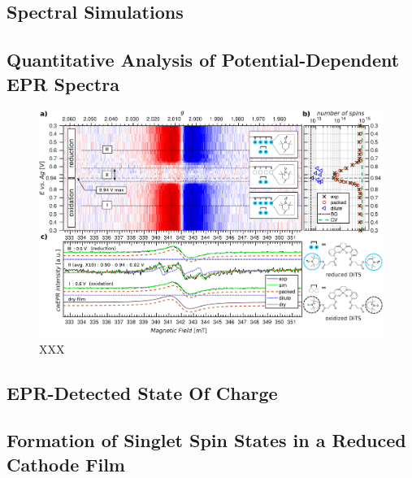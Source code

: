 \subsection{Spectral Simulations}

\subsection{Quantitative Analysis of Potential-Dependent EPR Spectra}
\begin{figure}[h]
\center
	\includegraphics[width=1\textwidth]{./operando_epr/figures/Main_2D_redox_map_full.pdf}
	\caption{XXX}
	\label{fig:operando_carpet}
\end{figure}
\subsection{EPR-Detected State Of Charge}

\subsection{Formation of Singlet Spin States in a Reduced Cathode Film}

